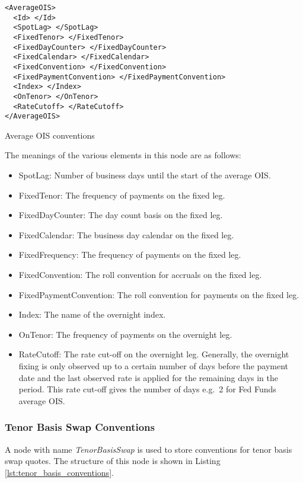 \begin{listing}[H]
\begin{verbatim}
<AverageOIS>
  <Id> </Id>
  <SpotLag> </SpotLag>
  <FixedTenor> </FixedTenor>
  <FixedDayCounter> </FixedDayCounter>
  <FixedCalendar> </FixedCalendar>
  <FixedConvention> </FixedConvention>
  <FixedPaymentConvention> </FixedPaymentConvention>
  <Index> </Index>
  <OnTenor> </OnTenor>
  <RateCutoff> </RateCutoff>
</AverageOIS>
\end{verbatim}
\caption{Average OIS conventions}
\label{lst:average_ois_conventions}
\end{listing}


The meanings of the various elements in this node are as follows:
\begin{itemize}
\item SpotLag: Number of business days until the start of the average OIS.
\item FixedTenor: The frequency of payments on the fixed leg.
\item FixedDayCounter: The day count basis on the fixed leg.
\item FixedCalendar: The business day calendar on the fixed leg.
\item FixedFrequency: The frequency of payments on the fixed leg.
\item FixedConvention: The roll convention for accruals on the fixed leg.
\item FixedPaymentConvention: The roll convention for payments on the fixed leg.
\item Index: The name of the overnight index.
\item OnTenor: The frequency of payments on the overnight leg.
\item RateCutoff: The rate cut-off on the overnight leg. Generally, the overnight fixing is only observed up to a
certain number of days before the payment date and the last observed rate is applied for the remaining days in the
period. This rate cut-off gives the number of days e.g.\ 2 for Fed Funds average OIS.
\end{itemize}

\subsubsection{Tenor Basis Swap Conventions}
A node with name \emph{TenorBasisSwap} is used to store conventions for tenor basis swap quotes. The structure of this 
node is shown in Listing \ref{lst:tenor_basis_conventions}.

